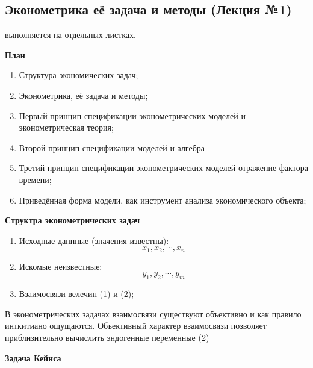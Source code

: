 \documentclass[12pt,a4paper]{article}
\author{GH-TIMe}
\begin{document}
\begin{center}
\section*{Эконометрика её задача и методы (Лекция №1)}
\end{center}

 выполняется на отдельных листках.
\begin{center}
\textbf{План}
\end{center}
\begin{enumerate}
\item Структура экономических задач;
\item Эконометрика, её задача и методы;
\item Первый принцип спецификации эконометрических моделей и эконометрическая теория;
\item Второй принцип спецификации моделей и алгебра
\item Третий принцип спецификации эконометрических моделей отражение фактора времени;
\item Приведённая форма модели, как инструмент анализа экономического объекта;
\end{enumerate}
\textbf{Структра эконометрических задач}
\begin{enumerate}
\item Исходные даннные (значения известны): \begin{equation}
x_1, x_2, \cdots, x_n
\end{equation}
\item Искомые неизвестные: \begin{equation}
y_1, y_2, \cdots, y_m
\end{equation}
\item Взаимосвязи велечин (1) и (2);
\end{enumerate}

В эконометрических задачах взаимосвязи существуют объективно и как правило инткитиано ощущаются. Объективный характер взаимосвязи позволяет приблизительно вычислить эндогенные переменные (2)

\textbf{Задача Кейнса}
\end{document}
